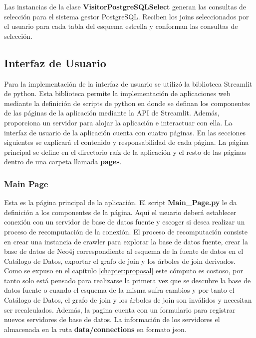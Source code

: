 Las instancias de la clase \textbf{VisitorPostgreSQLSelect} generan las consultas de selección para 
el sistema gestor PostgreSQL. Reciben los joins seleccionados por el usuario para cada tabla del esquema 
estrella y conforman las consultas de selección.

\subsection{Interfaz de Usuario}

Para la implementación de la interfaz de usuario se utilizó la biblioteca Streamlit de python. Esta biblioteca 
permite la implementación de aplicaciones web mediante la definición de scripts de python en donde se 
definan los componentes de las páginas de la aplicación mediante la API de Streamlit. Además, proporciona un 
servidor para alojar la aplicación e interactuar con ella. La interfaz de usuario de la aplicación cuenta 
con cuatro páginas. En las secciones siguientes se explicar\'a el contenido y responsabilidad de cada página. 
La página principal se define en el directorio raíz de la aplicación y el resto de las páginas dentro 
de una carpeta llamada \textbf{pages}.

\subsubsection{Main Page}

Esta es la página principal de la aplicación. El script \textbf{Main\_Page.py} le da definición 
a los componentes de la página. Aquí el usuario deber\'a establecer conexión con un servidor de 
base de datos fuente y escoger si desea realizar un proceso de recomputaci\'on de la conexión. El 
proceso de recomputaci\'on consiste en crear una instancia de crawler para explorar la base de datos 
fuente, crear la base de datos de Neo4j correspondiente al esquema de la fuente de datos en el Catálogo 
de Datos, exportar el grafo de join y los \'arboles de join derivados. Como se expuso en el capítulo 
\ref{chapter:proposal} este cómputo es costoso, por tanto solo est\'a pensado para realizarse la primera 
vez que se descubre la base de datos fuente o cuando el esquema de la misma sufra cambios y por tanto 
el Catálogo de Datos, el grafo de join y los \'arboles de join son inválidos y necesitan ser recalculados. 
Además, la pagina cuenta con un formulario para registrar nuevos servidores de base de datos. La información 
de los servidores el almacenada en la ruta \textbf{data/connections} en formato json.

